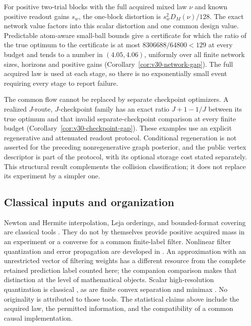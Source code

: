 For positive two-trial blocks with the full acquired mixed law $\nu$
and known positive readout gains $s_w$, the one-block distortion is
$s_w^2D_M(\nu)/128$. The exact network value factors into this scalar
distortion and one common design value. Predictable atom-aware
small-ball bounds give a certificate for which the ratio of the true
optimum to the certificate is at most $8306688/64800<129$ at every budget and tends to a number
in $(4.05,4.06)$, uniformly over all finite network sizes, horizons and
positive gains (Corollary~\ref{cor:v30-network-gap}). The full acquired
law is used at each stage, so there is no exponentially small event
requiring every stage to report failure.

The common flow cannot be replaced by separate checkpoint optimizers.
A realized $J$-route, $J$-checkpoint family has an exact ratio
$J+1-1/J$ between its true optimum and that invalid separate-checkpoint
comparison at every finite budget
(Corollary~\ref{cor:v30-checkpoint-gap}). These examples use an explicit
regenerative and attenuated readout protocol. Conditional regeneration
is not asserted for the preceding nonregenerative graph posterior, and
the public vertex descriptor is part of the protocol, with its optional
storage cost stated separately. This structural result complements the
collision classification; it does not replace its experiment by a
simpler one.

\subsection{Classical inputs and organization}
Newton and Hermite interpolation, Leja orderings, and bounded-format
covering are classical tools
\cite{deBoor,Leja,BosEtAl,YomdinComte,ZhangKileel,ComteHalupczok}.
They do not by themselves provide positive acquired mass in an
experiment or a converse for a common finite-label filter. Nonlinear
filter quantization and error propagation are developed in
\cite{PagesPham2005,PagesSagna2018}. An approximation with an
unrestricted vector of filtering weights has a different resource
from the complete retained prediction label counted here; the companion
comparison makes that distinction at the level of mathematical objects.
Scalar high-resolution quantization is classical
\cite{GrafLuschgy2000}, as are finite convex separation and minimax
\cite{Rockafellar1964}. No originality is attributed to those tools.
The statistical claims above include the acquired law, the permitted
information, and the compatibility of a common causal implementation.

